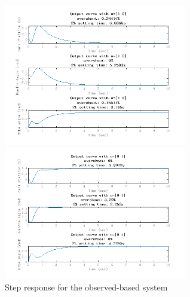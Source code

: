 \documentclass[hyperref]{article}
\theoremstyle{nonumberplain}
\begin{document}
	\begin{figure}[H]
		\centering
		\begin{minipage}[t]{0.48\textwidth}
			\centering
			\includegraphics[width=8cm]{fig21.png}
		\end{minipage}
		\begin{minipage}[t]{0.48\textwidth}
			\centering
			\includegraphics[width=8cm]{fig22.png}
		\end{minipage}
		\caption{Step response for the observed-based system}
		\label{fig16}
	\end{figure}
\end{document}
